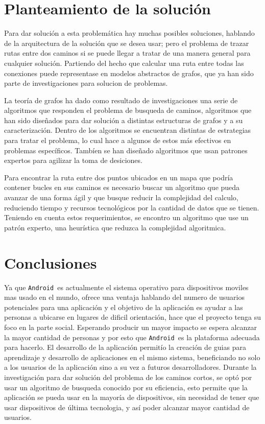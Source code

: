 \documentclass[journal]{IEEEtran}
\newcommand{\andr}{\texttt{Android~}}
\begin{document}
\section{Planteamiento de la solución}
Para dar solución a esta problemática hay muchas posibles soluciones, hablando de la arquitectura de la solución que se desea usar;
pero el problema de trazar rutas entre dos caminos si se puede llegar a tratar de una manera general para cualquier solución. Partiendo del hecho que calcular una ruta entre todas las conexiones puede representase en modelos abstractos de grafos, que ya han sido parte de investigaciones para solucion de problemas.

La teoría de grafos ha dado como resultado de investigaciones una serie de algoritmos que responden el problema de busqueda de caminos, algoritmos que han sido diseñados para dar solución a distintas estructuras de grafos y a su caracterización. Dentro de los algoritmos se encuentran distintas de estrategias para tratar el problema, lo cual hace a algunos de estos más efectivos en problemas específicos. Tambíen se han diseñado algoritmos que usan patrones expertos para agilizar la toma de desiciones.

Para encontrar la ruta entre dos puntos ubicados en un mapa que podría contener bucles en sus caminos es necesario buscar un algoritmo que pueda avanzar de una forma ágil y que busque reducir la complejidad del calculo, reduciendo tiempo y recursos tecnológicos por la cantidad de datos que se tienen. Teniendo en cuenta estos requerimientos, se encontro un algoritmo que use un patrón experto, una heurística que reduzca la complejidad algoritmica.

\section{Conclusiones}
Ya que \andr es actualmente el sistema operativo para dispositivos moviles mas usado en el mundo, ofrece una ventaja
hablando del numero de usuarios potenciales para una aplicación y el objetivo de la aplicación es ayudar a las personas a
ubicarse en lugares de dificil orientación, hace que el proyecto tenga su foco en la parte social. Esperando producir un
mayor impacto se espera alcanzar la mayor cantidad de personas y por esto que \andr es la plataforma adecuada para hacerlo.
El desarrollo de la aplicación permitío la creación de guias para aprendizaje y desarrollo de aplicaciones en el mismo
sistema, beneficiando no solo a los usuarios de la aplicación sino a su vez a futuros desarrolladores. Durante la
investigación para dar solución del problema de los caminos cortos, se optó por usar un algoritmo de busqueda conocido por
su eficiencia, esto permite que la aplicación se pueda usar en la mayoría de dispositivos, sin necesidad de tener que usar
dispositivos de última tecnologia, y así poder alcanzar mayor cantidad de usuarios.
\end{document}

